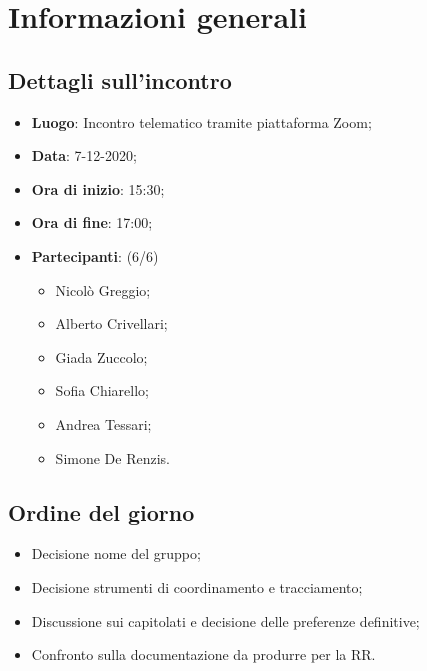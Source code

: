 \section{Informazioni generali}

\subsection{Dettagli sull'incontro}
\begin{itemize}
\item \textbf{Luogo}: Incontro telematico tramite piattaforma Zoom;
\item \textbf{Data}: 7-12-2020;
\item \textbf{Ora di inizio}: 15:30;
\item \textbf{Ora di fine}: 17:00;
\item \textbf{Partecipanti}: (6/6) 
\begin{itemize}
	\item Nicolò Greggio;
	\item Alberto Crivellari;
	\item Giada Zuccolo;
	\item Sofia Chiarello;
	\item Andrea Tessari;
	\item Simone De Renzis.
\end{itemize}
\end{itemize}

\subsection{Ordine del giorno}
\begin{itemize}
	\item Decisione nome del gruppo;
	\item Decisione strumenti di coordinamento e tracciamento;
	\item Discussione sui capitolati e decisione delle preferenze definitive;
	\item Confronto sulla documentazione da produrre per la RR.
\end{itemize}


